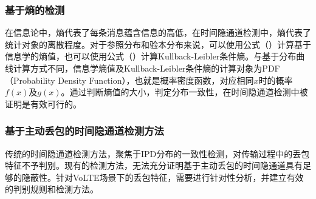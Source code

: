 \subsubsection{基于熵的检测}
在信息论中，熵代表了每条消息蕴含信息的高低，在时间隐通道检测中，熵代表了统计对象的离散程度。对于参照分布和验本分布来说，可以使用公式（）计算基于信息学的熵值，也可以使用公式（）计算Kullback-Leibler条件熵。与基于分布曲线计算方式不同，信息学熵值及Kullback-Leibler条件熵的计算对象为PDF（Probability Density Function），也就是概率密度函数，对应相同$x$时的概率$f(x)$及$g(x)$。通过判断熵值的大小，判定分布一致性，在时间隐通道检测中被证明是有效可行的。

\subsubsection{基于主动丢包的时间隐通道检测方法}
传统的时间隐通道检测方法，聚焦于IPD分布的一致性检测，对传输过程中的丢包特征不予判别。现有的检测方法，无法充分证明基于主动丢包的时间隐通道具有足够的隐蔽性。针对VoLTE场景下的丢包特征，需要进行针对性分析，并建立有效的判别规则和检测方法。

